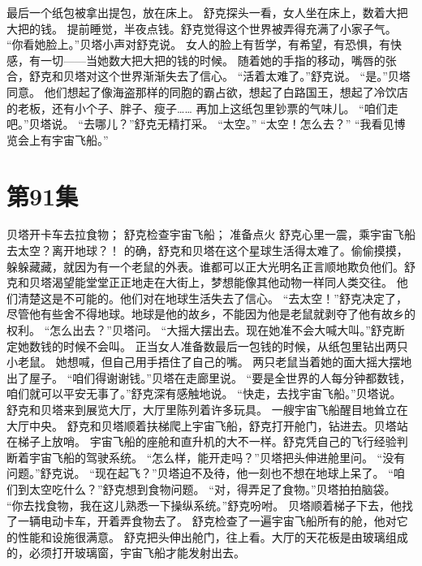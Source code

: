 \documentclass[a4paper,12pt,UTF8,twoside]{ctexbook}
\begin{document}
        最后一个纸包被拿出提包，放在床上。 
        舒克探头一看，女人坐在床上，数着大把大把的钱。 
        提前睡觉，半夜点钱。舒克觉得这个世界被弄得充满了小家子气。 
        “你看她脸上。”贝塔小声对舒克说。 
        女人的脸上有哲学，有希望，有恐惧，有快感，有一切——当她数大把大把的钱的时候。 
        随着她的手指的移动，嘴唇的张合，舒克和贝塔对这个世界渐渐失去了信心。 
        “活着太难了。”舒克说。 
        “是。”贝塔同意。 
        他们想起了像海盗那样的同胞的霸占欲，想起了白路国王，想起了冷饮店的老板，还有小个子、胖子、瘦子…… 
        再加上这纸包里钞票的气味儿。 
        “咱们走吧。”贝塔说。 
        “去哪儿？”舒克无精打采。 
        “太空。” 
        “太空！怎么去？” 
        “我看见博览会上有宇宙飞船。”   \chapter{第91集} 
        贝塔开卡车去拉食物； 
        舒克检查宇宙飞船； 
        准备点火   
        舒克心里一震，乘宇宙飞船去太空？离开地球？！ 
        的确，舒克和贝塔在这个星球生活得太难了。偷偷摸摸，躲躲藏藏，就因为有一个老鼠的外表。谁都可以正大光明名正言顺地欺负他们。舒克和贝塔渴望能堂堂正正地走在大街上，梦想能像其他动物一样同人类交往。 
        他们清楚这是不可能的。他们对在地球生活失去了信心。 
        “去太空！”舒克决定了，尽管他有些舍不得地球。地球是他的故乡，不能因为他是老鼠就剥夺了他有故乡的权利。 
        “怎么出去？”贝塔问。 
        “大摇大摆出去。现在她准不会大喊大叫。”舒克断定她数钱的时候不会叫。 
        正当女人准备数最后一包钱的时候，从纸包里钻出两只小老鼠。 
        她想喊，但自己用手捂住了自己的嘴。 
        两只老鼠当着她的面大摇大摆地出了屋子。 
        “咱们得谢谢钱。”贝塔在走廊里说。 
        “要是全世界的人每分钟都数钱，咱们就可以平安无事了。”舒克深有感触地说。 
        “快走，去找宇宙飞船。”贝塔说。 
        舒克和贝塔来到展览大厅，大厅里陈列着许多玩具。 
        一艘宇宙飞船醒目地耸立在大厅中央。 
        舒克和贝塔顺着扶梯爬上宇宙飞船，舒克打开舱门，钻进去。贝塔站在梯子上放哨。 
        宇宙飞船的座舱和直升机的大不一样。舒克凭自己的飞行经验判断着宇宙飞船的驾驶系统。 
        “怎么样，能开走吗？”贝塔把头伸进舱里问。 
        “没有问题。”舒克说。 
        “现在起飞？”贝塔迫不及待，他一刻也不想在地球上呆了。 
        “咱们到太空吃什么？”舒克想到食物问题。 
        “对，得弄足了食物。”贝塔拍拍脑袋。 
        “你去找食物，我在这儿熟悉一下操纵系统。”舒克吩咐。 
        贝塔顺着梯子下去，他找了一辆电动卡车，开着弄食物去了。 
        舒克检查了一遍宇宙飞船所有的舱，他对它的性能和设施很满意。 
        舒克把头伸出舱门，往上看。大厅的天花板是由玻璃组成的，必须打开玻璃窗，宇宙飞船才能发射出去。 
\end{document}
